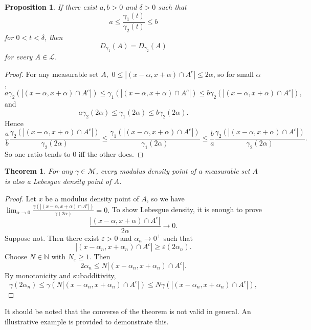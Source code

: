 \documentclass{amsart}
\newtheorem{theorem}{Theorem}
\theoremstyle{plain}
\newtheorem{proposition}{Proposition}
\numberwithin{equation}{section}
\begin{document}
\begin{proposition}\label{pn1.5}
 If there exist $a,b>0$ and $\delta>0$ such that
$$ a \leq \frac{\gamma_1(t)}{\gamma_2(t)} \leq b $$
for $0<t<\delta$, then $$ D_{\gamma_1}(A)=D_{\gamma_2}(A) $$
for every $A\in \mathcal{L}$.
\end{proposition}
\begin{proof}
For any measurable set $A,$  $0\leq |(x-\alpha,x+\alpha)\cap A^c| \leq 2\alpha$, so for small $\alpha$,
$$ a\gamma_2(|(x-\alpha,x+\alpha)\cap A^c|)\leq \gamma_1(|(x-\alpha,x+\alpha)\cap A^c|)\leq b\gamma_2(|(x-\alpha,x+\alpha)\cap A^c|), $$
and
$$ a\gamma_2(2\alpha)\leq \gamma_1(2\alpha)\leq b\gamma_2(2\alpha). $$
Hence
$$ \frac{a}{b}\frac{\gamma_2(|(x-\alpha,x+\alpha)\cap A^c|)}{\gamma_2(2\alpha)} \leq
\frac{\gamma_1(|(x-\alpha,x+\alpha)\cap A^c|)}{\gamma_1(2\alpha)} \leq
\frac{b}{a}\frac{\gamma_2(|(x-\alpha,x+\alpha)\cap A^c|)}{\gamma_2(2\alpha)}. $$
So one ratio tends to $0$ iff the other does.
\end{proof}
\begin{theorem}\label{thm6}
For any $\gamma\in \mathcal{M}$,
every modulus density point of a measurable set $A$ 
is also a Lebesgue density point of 
$A$.
\end{theorem}
\begin{proof}
Let $x$ be a modulus density point of $A$, so we have $\lim_{\alpha \to 0} \frac{\gamma(|(x-\alpha,x+\alpha)\cap A^c|)}{\gamma(2\alpha)}=0.$
To show Lebesgue density, it is enough to prove
$$ \frac{|(x-\alpha,x+\alpha)\cap A^c|}{2\alpha} \to 0.$$
Suppose not. Then there exist $\varepsilon>0$ and $\alpha_n \to 0^+$ such that
$$|(x-\alpha_n,x+\alpha_n)\cap A^c| \geq \varepsilon(2\alpha_n).$$
Choose $N\in \mathbb{N}$ with $N_\varepsilon \geq 1$. Then
$$ 2\alpha_n \leq N |(x-\alpha_n,x+\alpha_n)\cap A^c|. $$
By monotonicity and subadditivity,
$$ \gamma(2\alpha_n)\leq \gamma(N|(x-\alpha_n,x+\alpha_n)\cap A^c|)\leq N\gamma(|(x-\alpha_n,x+\alpha_n)\cap A^c|), $$
\end{proof}
It should be noted that the converse of the theorem is not valid in general. An illustrative example is provided to demonstrate this.
\end{document}
